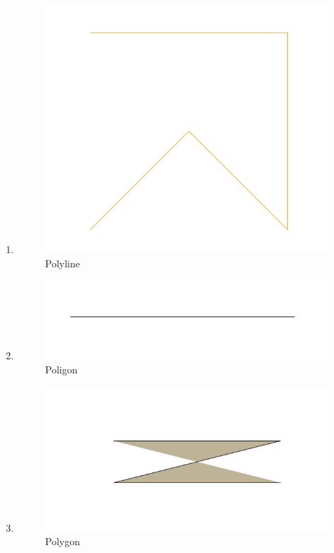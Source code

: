 \begin{enumerate}
	\item 
	
	\begin{figure}[H]
		\includegraphics[width=12cm]{figures/1174050/5.PNG}
		\centering
		\caption{Polyline}
	\end{figure}
	
	\item 
	
	\begin{figure}[H]
		\includegraphics[width=12cm]{figures/1174050/6.PNG}
		\centering
		\caption{Poligon}
	\end{figure}
	
	\item 
	
	\begin{figure}[H]
		\includegraphics[width=12cm]{figures/1174050/7.PNG}
		\centering
		\caption{Polygon}
	\end{figure}
	

\end{enumerate}
